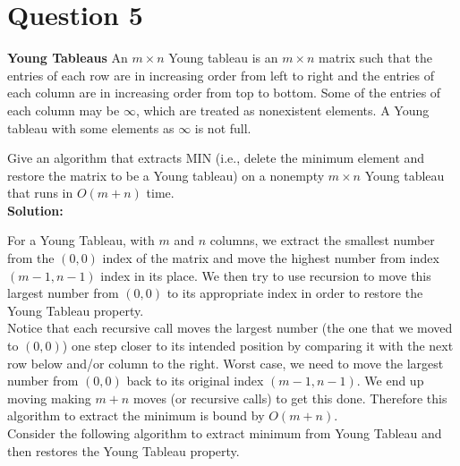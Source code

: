 \documentclass[11pt]{article}
\begin{document}
\section{Question 5} \textbf{Young Tableaus} An $m \times n$ Young tableau is an $m\times n$ matrix such that the entries of each row are in increasing order from left to right and the entries of each column are in increasing order from top to bottom. Some of the entries of each column may be $\infty$, which are treated as nonexistent elements. A Young tableau with some elements as $\infty$ is not full. 

Give an algorithm that extracts MIN (i.e., delete the minimum element and restore the matrix to be a Young tableau) on a nonempty $m\times n$ Young tableau that runs in $O(m+n)$ time. \\

\textbf{Solution:} 

For a Young Tableau, with $ m $ and $ n $ columns, we extract the smallest number from the $ (0,0) $ index of the matrix and move the highest number from index $ (m-1, n-1) $ index in its place. We then try to use recursion to move this largest number from $ (0,0) $ to its appropriate index in order to restore the Young Tableau property. \\

Notice that each recursive call moves the largest number (the one that we moved to $ (0,0) $) one step closer to its intended position by comparing it with the next row below and/or column to the right. Worst case, we need to move the largest number from $ (0,0) $ back to its original index $ (m-1, n-1) $. We end up moving making $ m+n $ moves (or recursive calls) to get this done. Therefore this algorithm to extract the minimum is bound by $ O(m+n) $. \\

Consider the following algorithm to extract minimum from Young Tableau and then restores the Young Tableau property. \\
\end{document}
